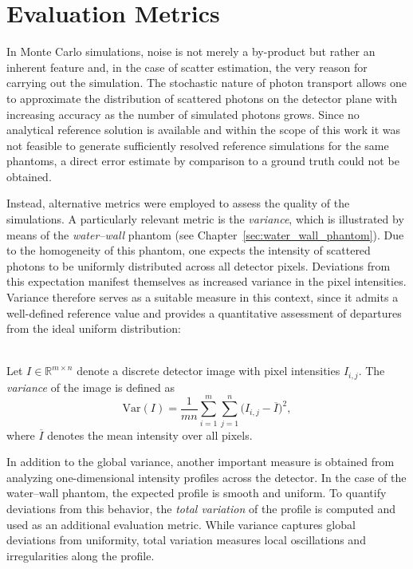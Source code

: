 \section{Evaluation Metrics}
\label{sec:evaluation_metrics}

In Monte Carlo simulations, noise is not merely a by-product but rather an 
inherent feature and, in the case of scatter estimation, the very reason 
for carrying out the simulation. The stochastic nature of photon transport 
allows one to approximate the distribution of scattered photons on the 
detector plane with increasing accuracy as the number of simulated photons 
grows. Since no analytical reference solution is available and within the 
scope of this work it was not feasible to generate sufficiently resolved 
reference simulations for the same phantoms, a direct error estimate by 
comparison to a ground truth could not be obtained.  

Instead, alternative metrics were employed to assess the quality of the
simulations. A particularly relevant metric is the \emph{variance}, which is
illustrated by means of the \emph{water--wall} phantom (see
Chapter~\ref{sec:water_wall_phantom}). Due to the homogeneity of this phantom,
one expects the intensity of scattered photons to be uniformly distributed
across all detector pixels. Deviations from this expectation manifest themselves
as increased variance in the pixel intensities. Variance therefore serves as a
suitable measure in this context, since it admits a well-defined reference value
and provides a quantitative assessment of departures from the ideal uniform
distribution:  

\begin{definition}\ \\
Let $I \in \mathbb{R}^{m \times n}$ denote a discrete detector image with 
pixel intensities $I_{i,j}$. The \emph{variance} of the image is defined as
\[
    \mathrm{Var}(I) = \frac{1}{mn} \sum_{i=1}^m \sum_{j=1}^n 
    \bigl(I_{i,j} - \overline{I}\bigr)^2,
\]
where $\overline{I}$ denotes the mean intensity over all pixels.
\label{def:variance_image}
\end{definition}  

In addition to the global variance, another important measure is obtained 
from analyzing one-dimensional intensity profiles across the detector. In 
the case of the water--wall phantom, the expected profile is smooth and 
uniform. To quantify deviations from this behavior, the \emph{total 
variation} of the profile is computed and used as an additional evaluation 
metric. While variance captures global deviations from uniformity, total 
variation measures local oscillations and irregularities along the profile.  

